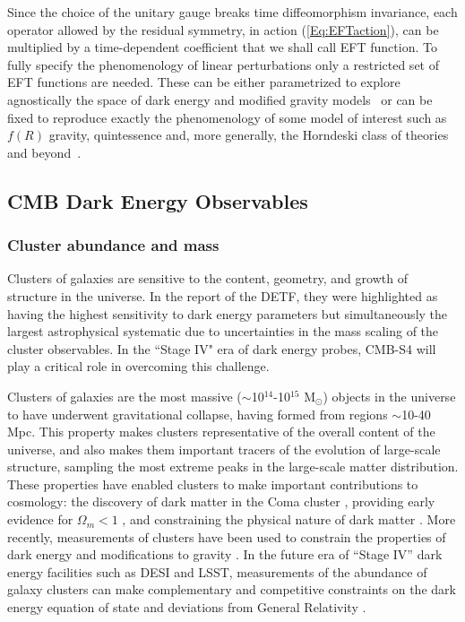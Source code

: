 Since the choice of the unitary gauge breaks time diffeomorphism invariance, each operator allowed by the residual symmetry, in action (\ref{Eq:EFTaction}), can be multiplied by a time-dependent coefficient that we shall call EFT function. To fully specify the phenomenology of linear perturbations only a restricted set of EFT functions are needed. These can be either parametrized to explore agnostically the space of dark energy and modified gravity models~\cite{Gleyzes:2013ooa,Bloomfield:2013efa,Piazza:2013coa,Gleyzes:2014rba} or can be fixed to reproduce exactly the phenomenology of some model of interest such as $f(R)$ gravity, quintessence and, more generally, the Horndeski class of theories and beyond~\cite{Gleyzes:2014dya,Frusciante:2015maa,Frusciante:2016xoj}.
%
\subsection{CMB  Dark Energy Observables}

\subsubsection{Cluster abundance and mass}

Clusters of galaxies are sensitive to the content, geometry, and growth of structure in the universe.     In the report of the DETF, they were highlighted as having the highest sensitivity
to dark energy parameters  but simultaneously the largest astrophysical systematic due
to uncertainties in the mass scaling of the cluster observables.   In the ``Stage IV" era of
dark energy probes, CMB-S4 will play a critical role in overcoming this challenge.




Clusters of galaxies are the most massive ($\sim$10$^{14}$-10$^{15}$ M$_{\odot}$) objects in the universe to have underwent gravitational collapse, 
having formed from regions $\sim$10-40 Mpc.  This property makes clusters representative of the overall content of the universe, and also makes them 
important tracers of the evolution of large-scale structure, sampling the most extreme peaks in the large-scale matter distribution.  
These properties have enabled clusters to make important contributions to cosmology: the discovery of dark matter in the 
Coma cluster \cite{1933AcHPh...6..110Z}, 
providing early evidence for $\Omega_m < 1$ \cite{white93a, Donahue98, Bahcall98}, and
constraining the physical nature of dark matter \cite{Clowe06}.  
More recently, measurements of clusters have been used to constrain the properties of dark energy and modifications 
to gravity \cite{vikhlinin09, mantz10a, rapetti13, benson13, mantz14, mantz15}.   In the future era of ``Stage IV'' dark energy 
facilities such as DESI and LSST, measurements of the abundance of galaxy clusters can make complementary and 
competitive constraints on the dark energy equation of state and deviations from General Relativity \cite{weinberg13}.  

